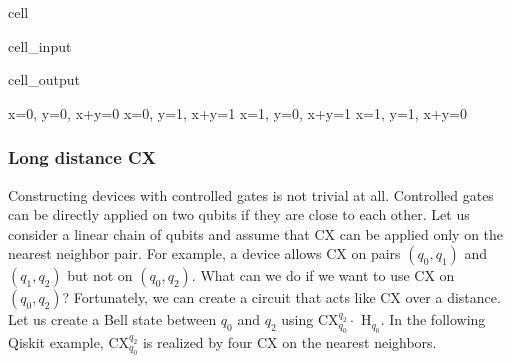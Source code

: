 \documentclass[letterpaper,10pt,english]{jupyterBook}
\begin{document}
\begin{sphinxuseclass}{cell}
\begin{sphinxVerbatimInput}
\begin{sphinxuseclass}{cell_input}
\end{sphinxuseclass}\end{sphinxVerbatimInput}
\begin{sphinxVerbatimOutput}

\begin{sphinxuseclass}{cell_output}
\begin{sphinxVerbatim}[commandchars=\\\{\}]
x=0, y=0, x+y=0
x=0, y=1, x+y=1
x=1, y=0, x+y=1
x=1, y=1, x+y=0
\end{sphinxVerbatim}

\end{sphinxuseclass}\end{sphinxVerbatimOutput}

\end{sphinxuseclass}

\subsubsection{Long distance CX}
\label{\detokenize{q2gates/cx:long-distance-cx}}
\sphinxAtStartPar
Constructing devices with controlled gates is not trivial at all.  Controlled gates can be directly applied on two qubits if they are close to each other.  Let us consider a linear chain of qubits and assume that CX can be applied only on the nearest neighbor pair.  For example, a device allows CX on pairs \((q_0, q_1)\) and \((q_1, q_2)\) but not on \((q_0, q_2)\).  What can we do if we want to use CX on \((q_0,q_2)\)?   Fortunately, we can create a circuit that acts like CX over a distance.  Let us create a Bell state between \(q_0\) and \(q_2\) using CX\(_{q_0}^{q_2} \cdot\) H\(_{q_0}\).  In the following Qiskit example, CX\(_{q_0}^{q_2}\) is realized by four CX on the nearest neighbors.
\end{document}
